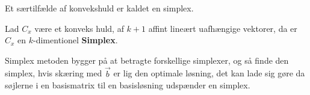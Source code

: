 Et særtilfælde af konvekshuld er kaldet en simplex.
\begin{defn}[Simplex]
Lad $C_x$ være et konveks huld, af $k+1$ affint lineært uafhængige vektorer, da er $C_x$ en $k$-dimentionel \textbf{Simplex}.
\end{defn}
Simplex metoden bygger på at betragte forskellige simplexer, og så finde den simplex, hvis skæring med $\vec{b}$ er lig den optimale løsning, det kan lade sig gøre da søjlerne i en basismatrix til en basisløsning udspænder en simplex.